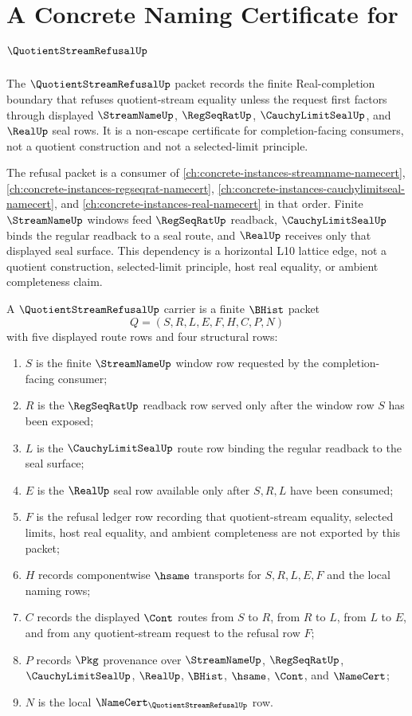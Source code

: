 \chapter{A Concrete Naming Certificate for $\QuotientStreamRefusalUp$}
\label{ch:concrete-instances-quotientstreamrefusal-namecert}

The $\QuotientStreamRefusalUp$ packet records the finite Real-completion boundary that refuses quotient-stream equality unless the request first factors through displayed $\StreamNameUp$, $\RegSeqRatUp$, $\CauchyLimitSealUp$, and $\RealUp$ seal rows. It is a non-escape certificate for completion-facing consumers, not a quotient construction and not a selected-limit principle.

The refusal packet is a consumer of \autoref{ch:concrete-instances-streamname-namecert}, \autoref{ch:concrete-instances-regseqrat-namecert}, \autoref{ch:concrete-instances-cauchylimitseal-namecert}, and \autoref{ch:concrete-instances-real-namecert} in that order. Finite $\StreamNameUp$ windows feed $\RegSeqRatUp$ readback, $\CauchyLimitSealUp$ binds the regular readback to a seal route, and $\RealUp$ receives only that displayed seal surface. This dependency is a horizontal L10 lattice edge, not a quotient construction, selected-limit principle, host real equality, or ambient completeness claim.

\begin{definition}
\label{def:quotient-stream-refusal-carrier}
A $\QuotientStreamRefusalUp$ carrier is a finite $\BHist$ packet
$$
Q=(S,R,L,E,F,H,C,P,N)
$$
with five displayed route rows and four structural rows:
\begin{enumerate}
\item $S$ is the finite $\StreamNameUp$ window row requested by the completion-facing consumer;
\item $R$ is the $\RegSeqRatUp$ readback row served only after the window row $S$ has been exposed;
\item $L$ is the $\CauchyLimitSealUp$ route row binding the regular readback to the seal surface;
\item $E$ is the $\RealUp$ seal row available only after $S,R,L$ have been consumed;
\item $F$ is the refusal ledger row recording that quotient-stream equality, selected limits, host real equality, and ambient completeness are not exported by this packet;
\item $H$ records componentwise $\hsame$ transports for $S,R,L,E,F$ and the local naming rows;
\item $C$ records the displayed $\Cont$ routes from $S$ to $R$, from $R$ to $L$, from $L$ to $E$, and from any quotient-stream request to the refusal row $F$;
\item $P$ records $\Pkg$ provenance over $\StreamNameUp$, $\RegSeqRatUp$, $\CauchyLimitSealUp$, $\RealUp$, $\BHist$, $\hsame$, $\Cont$, and $\NameCert$;
\item $N$ is the local $\NameCert_{\QuotientStreamRefusalUp}$ row.
\end{enumerate}
\end{definition}


